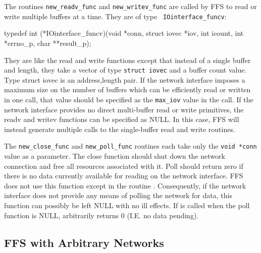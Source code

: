 The routines {\tt new\_readv\_func} and {\tt new\_writev\_func} are called by
FFS to read or write multiple buffers at a time.  They are of type {\tt
IOinterface\_funcv}:
\begin{Code}
typedef int (*IOinterface_funcv)(void *conn, struct iovec *iov, int icount,
                                 int *errno_p, char **result_p);
\end{Code}
They are like the read and write functions except that instead of a single
buffer and length, they take a vector of type {\tt struct iovec} and a buffer
count value. Type {struct iovec} is an address,length pair.  If the network
interface imposes a maximum size on the number of buffers which can be
efficiently read or written in one call, that value should be specified as the
{\tt max\_iov} value in the  call.  If the
network interface provides no direct multi-buffer read or write primitives,
the readv and writev functions can be specified as NULL.  In this case, FFS
will instead generate multiple calls to the single-buffer read and write
routines. 

The {\tt new\_close\_func} and {\tt new\_poll\_func} routines each take only
the {\tt void *conn} value as a parameter.  The close function should shut
down the network connection and free all resources associated with it.  Poll
should return zero if there is no data currently available for reading on the
network interface.  FFS does not use this function except in the routine
.  Consequently, if the network interface does not
provide any 
means of polling the network for data, this function can possibly be left NULL
with no ill effects.  If  is called when the poll function
is NULL,  arbitrarily returns 0 (I.E. no data pending).

\subsection{FFS with Arbitrary Networks\label{iocontext}}

